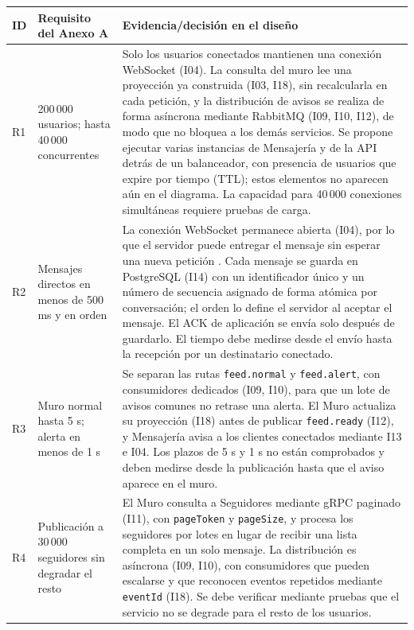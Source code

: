 \documentclass[12pt,a4paper]{article}
\begin{document}
\begingroup
\small
\begin{longtable}{@{}p{0.9cm}p{4cm}p{9.6cm}@{}}

\toprule
ID & Requisito del Anexo A & Evidencia/decisión en el diseño \\

\midrule
\endhead

R1 &
200\,000 usuarios; hasta 40\,000 concurrentes &
Solo los usuarios conectados mantienen una conexión WebSocket (I04). La
consulta del muro lee una proyección ya construida (I03, I18), sin recalcularla
en cada petición, y la distribución de avisos se realiza de forma asíncrona
mediante RabbitMQ (I09, I10, I12), de modo que no bloquea a los demás
servicios. Se propone ejecutar varias instancias de Mensajería y de la API
detrás de un balanceador, con presencia de usuarios que expire por tiempo
(TTL); estos elementos no aparecen aún en el diagrama. La capacidad para
40\,000 conexiones simultáneas requiere pruebas de carga. \\

R2 &
Mensajes directos en menos de 500 ms y en orden &
La conexión WebSocket permanece abierta (I04), por lo que el servidor puede
entregar el mensaje sin esperar una nueva petición
\cite{gangadevi2025chat,diaz2026protocols}. Cada mensaje se guarda en
PostgreSQL (I14) con un identificador único y un número de secuencia asignado
de forma atómica por conversación; el orden lo define el servidor al aceptar
el mensaje. El ACK de aplicación se envía solo después de guardarlo. El tiempo
debe medirse desde el envío hasta la recepción por un destinatario conectado. \\

R3 &
Muro normal hasta 5 s; alerta en menos de 1 s &
Se separan las rutas \texttt{feed.normal} y \texttt{feed.alert}, con
consumidores dedicados (I09, I10), para que un lote de avisos comunes no
retrase una alerta. El Muro actualiza su proyección (I18) antes de publicar
\texttt{feed.ready} (I12), y Mensajería avisa a los clientes conectados
mediante I13 e I04. Los plazos de 5 s y 1 s no están comprobados y deben
medirse desde la publicación hasta que el aviso aparece en el muro. \\

R4 &
Publicación a 30\,000 seguidores sin degradar el resto &
El Muro consulta a Seguidores mediante gRPC paginado (I11), con
\texttt{pageToken} y \texttt{pageSize}, y procesa los seguidores por lotes en
lugar de recibir una lista completa en un solo mensaje. La distribución es
asíncrona (I09, I10), con consumidores que pueden escalarse y que reconocen
eventos repetidos mediante \texttt{eventId} (I18). Se debe verificar mediante
pruebas que el servicio no se degrade para el resto de los usuarios. \\


\end{longtable}
\end{document}
